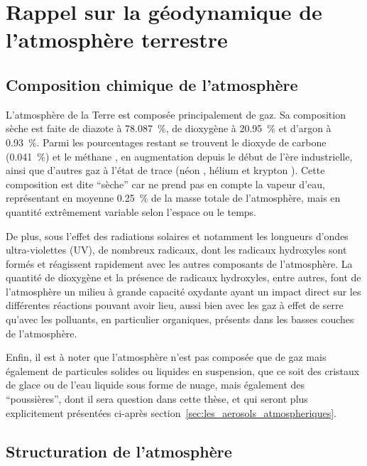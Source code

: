 
\section{Rappel sur la géodynamique de l'atmosphère terrestre}%
\label{sec:structure_atmosphere}

\subsection{Composition chimique de l'atmosphère}%
\label{ssub:composition_chimique_de_latmosphere}

L'atmosphère de la Terre est composée principalement de gaz. Sa composition sèche est
faite de diazote  à \SI{78.087}{\percent}, de dioxygène  à
\SI{20.95}{\percent} et d'argon  à \SI{0.93}{\percent}. Parmi les pourcentages restant
se trouvent le dioxyde de carbone  (\SI{0.041}{\percent}) et le méthane ,
en augmentation depuis le début de l'ère industrielle, ainsi que d'autres gaz à
l'état de trace (néon , hélium  et krypton ).  Cette composition est
dite ``sèche'' car ne prend pas en compte la vapeur d'eau, représentant en moyenne 
\SI{0.25}{\percent} de la masse totale de l'atmosphère, mais en quantité extrêmement
variable selon l'espace ou le temps.

De plus, sous l'effet des radiations solaires et notamment les longueurs d'ondes
ultra-violettes (UV), de nombreux radicaux, dont les radicaux hydroxyles  sont
formés et réagissent rapidement avec les autres composants de l'atmosphère.  La quantité
de dioxygène et la présence de radicaux hydroxyles, entre autres, font de l'atmosphère un
milieu à grande capacité oxydante ayant un impact direct sur les différentes réactions
pouvant avoir lieu, aussi bien avec les gaz à effet de serre qu'avec les polluants, en
particulier organiques, présents dans les basses couches de l'atmosphère.

Enfin, il est à noter que l'atmosphère n'est pas composée que de gaz mais également de
particules solides ou liquides en suspension, que ce soit des cristaux de glace ou de l'eau
liquide sous forme de nuage, mais également des ``poussières'', dont il sera question dans
cette thèse, et qui seront plus explicitement présentées ci-après
section~\ref{sec:les_aerosols_atmospheriques}.

\subsection{Structuration de l'atmosphère}%
\label{sub:structuration_de_l_atmosphere}

